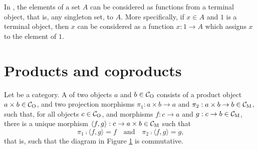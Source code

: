 \begin{example}

  \label{ex:terminal-objects-constants}

  In \set, the elements of a set $A$ can be considered as functions
  from a terminal object, that is, any singleton set, to $A$. More
  specifically, if $x \in A$ and $1$ is a terminal object, then $x$
  can be considered as a function $x: 1 \to A$ which assigns $x$ to
  the element of $1$.

\end{example}

\section{Products and coproducts}
\label{sec:constructions-products-coproducts}


\begin{definition}

  \label{def:product}


  Let  be a category. A  of two objects $a$ and
  $b \in \mathcal{C}_{\operatorname{O}}$ consists of a product object $a \times b \in
  \mathcal{C}_{\operatorname{O}}$, and two projection morphisms $\pi_{1}: a \times b \to a$
  and $\pi_{2}: a \times b \to b \in \mathcal{C}_{\operatorname{M}}$, such that, for all
  objects $c \in \mathcal{C}_{\operatorname{O}}$, and morphisms $f: c \to a$ and $g: c \to b
  \in \mathcal{C}_{\operatorname{M}}$, there is a unique morphism $\langle{f,g}\rangle: c
  \to a \times b \in \mathcal{C}_{\operatorname{M}}$ such that
  \begin{equation}
    \label{eq:product}
    \pi_{1} \comp \langle{f,g}\rangle = f
    \quad
    \text{and}
    \quad
    \pi_{2} \comp \langle{f,g}\rangle = g
    \text{,}
  \end{equation}
  that is, such that the diagram in Figure \ref{fig:product} is
  commutative.
  \begin{figure}[htbp]
    \begin{center}
    \end{center}
    \caption{}
    \label{fig:product}
  \end{figure}

\end{definition}

